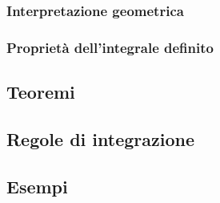 \documentclass[letterpaper,10pt,english]{jupyterBook}
\begin{document}
\subsubsection{Interpretazione geometrica}
\label{\detokenize{ch/multivariable-calculus/integrals:interpretazione-geometrica}}

\subsubsection{Proprietà dell’integrale definito}
\label{\detokenize{ch/multivariable-calculus/integrals:proprieta-dell-integrale-definito}}

\subsection{Teoremi}
\label{\detokenize{ch/multivariable-calculus/integrals:teoremi}}

\subsection{Regole di integrazione}
\label{\detokenize{ch/multivariable-calculus/integrals:regole-di-integrazione}}

\subsection{Esempi}
\label{\detokenize{ch/multivariable-calculus/integrals:esempi}}
\sphinxstepscope
\end{document}
